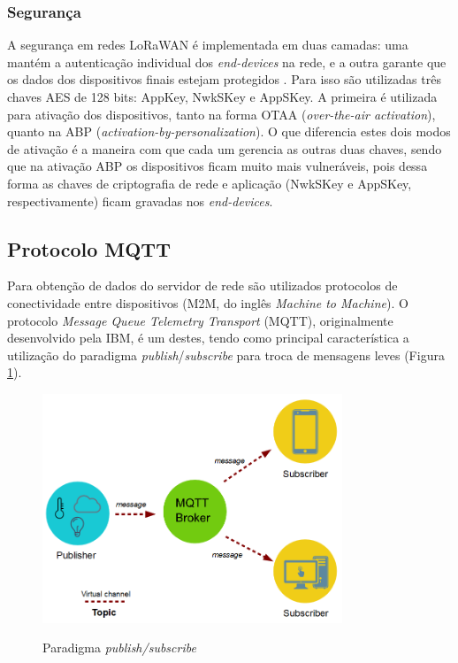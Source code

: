 \documentclass[oneside,openright,12pt]{ufsm_2015} %
\begin{document}
\subsubsection{Segurança}
A segurança em redes LoRaWAN é implementada em duas camadas: uma mantém a autenticação individual dos \textit{end-devices} na rede, e a outra garante que os dados dos dispositivos finais estejam protegidos \cite{lora-overview}. Para isso são utilizadas três chaves AES de 128 bits:  AppKey, NwkSKey e AppSKey. A primeira é utilizada para ativação dos dispositivos, tanto na forma OTAA (\textit{over-the-air activation}), quanto na ABP (\textit{activation-by-personalization}). O que diferencia estes dois modos de ativação é a maneira com que cada um gerencia as outras duas chaves, sendo que na ativação ABP os dispositivos ficam muito mais vulneráveis, pois dessa forma as chaves de criptografia de rede e aplicação (NwkSKey e AppSKey, respectivamente) ficam gravadas nos \textit{end-devices}.



\subsection{Protocolo MQTT}
Para obtenção de dados do servidor de rede são utilizados protocolos de conectividade entre dispositivos (M2M, do inglês \textit{Machine to Machine}). O protocolo \textit{Message Queue Telemetry Transport} (MQTT), originalmente desenvolvido pela IBM, é um destes, tendo como principal característica a utilização do paradigma \textit{publish}/\textit{subscribe} para troca de mensagens leves (Figura \ref{fig:mqtt-topico}).
\begin{figure}[H]
    \caption{\label{exepretex} Paradigma \textit{publish/subscribe}}
    \centering
    \includegraphics[width=0.8\textwidth]{figuras/publish-subscribe.png}
    \vspace{\baselineskip} %
        \label{fig:mqtt-topico}
\end{figure}
\end{document}
